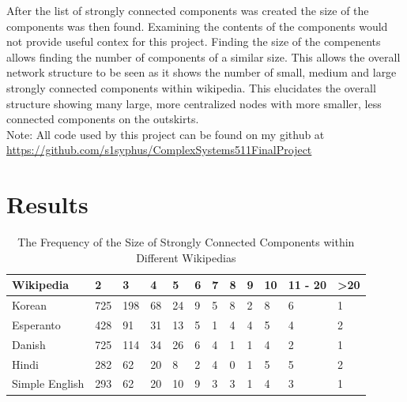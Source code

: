 \documentclass[twoside]{article}
\begin{document}
\begin{multicols}{2}
After the list of strongly connected components was created the size of the components was then found.
Examining the contents of the components would not provide useful contex for this project. Finding the
size of the compenents allows finding the number of components of a similar size. This allows the overall
network structure to be seen as it shows the number of small, medium and large strongly connected
components within wikipedia. This elucidates the overall structure showing many large, more centralized
nodes with more smaller, less connected components on the outskirts.\\

Note: All code used by this project can be found on my github at \url{https://github.com/s1syphus/ComplexSystems511FinalProject}


\end{multicols}

\newpage

\section{Results}


\begin{table}[h]

\caption{The Frequency of the Size of Strongly Connected Components within Different Wikipedias}
\centering

\begin{tabular}{| l | l | l | l | l | l |  l | l | l | l | l | l | }

\hline

Wikipedia & 2 & 3 & 4 & 5 & 6 & 7 & 8 & 9 & 10 & {11 - 20} & >20 \\ \hline

Korean & 725 & 198 & 68 & 24 & 9 & 5 & 8 & 2 & 8 & 6 & 1 \\ \hline

Esperanto & 428 & 91 & 31 & 13 & 5 & 1 & 4 & 4 & 5 & 4 & 2 \\ \hline

Danish & 725 & 114 & 34 & 26 & 6 & 4 & 1 & 1 & 4 & 2 & 1 \\ \hline

Hindi & 282 & 62 & 20 & 8 & 2 & 4 & 0 & 1 & 5  & 5 & 2 \\ \hline

Simple English & 293  & 62 & 20 & 10 & 9 & 3 & 3 & 1 & 4 & 3 & 1 \\ \hline


\end{tabular}

\end{table}
\end{document}
